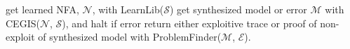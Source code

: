 
\begin{algorithm}[H]
{}
get learned NFA, $\mathcal{N}$, with LearnLib($\mathcal{S}$)\;
get synthesized model or error $\mathcal{M}$ with CEGIS($\mathcal{N}$, $\mathcal{S}$), and halt if error\;
return either exploitive trace or proof of non-exploit of synthesized model with ProblemFinder($\mathcal{M}$, $\mathcal{E}$). 
\end{algorithm}